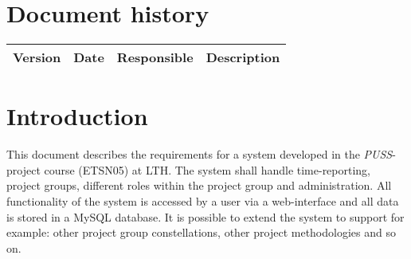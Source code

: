 \documentclass{article}
\begin{document}
\titleformat{\subsubsection}[runin]{\large\bfseries}{}{0pt}{#1\quad\thesubsubsection}


\newpage

\section*{Document history}

\begin{center}
    \begin{tabular}{ l l l l }
      Version       &      Date             &       Responsible    &   Description     \\ \hline
      
    \end{tabular}
\end{center}

\newpage

\tableofcontents

\newpage

\section{Introduction}
This document describes the requirements for a system developed in the \emph{PUSS}-project course (ETSN05)
at LTH. The system shall handle time-reporting, project groups, different roles within the project group and administration. All functionality of the system is accessed by a user via a web-interface and all data is stored in a MySQL database. It is possible to extend the system to support for example: other project group constellations, other project methodologies and so on.
\end{document}
